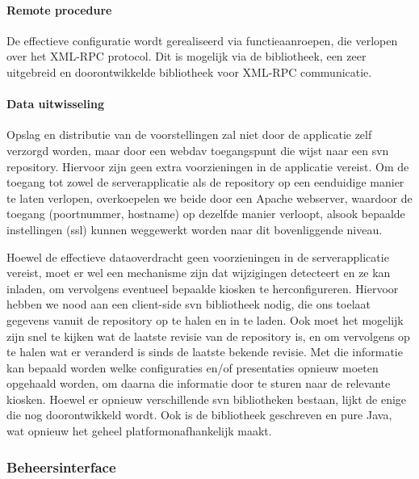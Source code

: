 \paragraph{Remote procedure} De effectieve configuratie wordt gerealiseerd via functieaanroepen, die verlopen over het XML-RPC protocol. Dit is mogelijk via de  bibliotheek, een zeer uitgebreid en doorontwikkelde bibliotheek voor XML-RPC communicatie.

\paragraph{Data uitwisseling} Opslag en distributie van de voorstellingen zal niet door de applicatie zelf verzorgd worden, maar door een \ac{webdav} toegangspunt die wijst naar een \ac{svn} repository. Hiervoor zijn geen extra voorzieningen in de applicatie vereist. Om de toegang tot zowel de serverapplicatie als de repository op een eenduidige manier te laten verlopen, overkoepelen we beide door een Apache webserver, waardoor de toegang (poortnummer, hostname) op dezelfde manier verloopt, alsook bepaalde instellingen (\ac{ssl}) kunnen weggewerkt worden naar dit bovenliggende niveau.

Hoewel de effectieve dataoverdracht geen voorzieningen in de serverapplicatie vereist, moet er wel een mechanisme zijn dat wijzigingen detecteert en ze kan inladen, om vervolgens eventueel bepaalde kiosken te herconfigureren. Hiervoor hebben we nood aan een client-side \ac{svn} bibliotheek nodig, die ons toelaat gegevens vanuit de repository op te halen en in te laden. Ook moet het mogelijk zijn snel te kijken wat de laatste revisie van de repository is, en om vervolgens op te halen wat er veranderd is sinds de laatste bekende revisie. Met die informatie kan bepaald worden welke configuraties en/of presentaties opnieuw moeten opgehaald worden, om daarna die informatie door te sturen naar de relevante kiosken.
Hoewel er opnieuw verschillende \ac{svn} bibliotheken bestaan, lijkt  de enige die nog doorontwikkeld wordt. Ook is de bibliotheek geschreven en pure Java, wat opnieuw het geheel platformonafhankelijk maakt.

\subsubsection{Beheersinterface}

